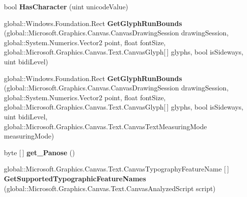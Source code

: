 \begin{DoxyCompactItemize}
bool {\bfseries Has\+Character} (uint unicode\+Value)
\item 
\mbox{\label{interface_microsoft_1_1_graphics_1_1_canvas_1_1_text_1_1_i_canvas_font_face_a32cd4710536dd3efe9632f63fb92dec4}} 
global\+::\+Windows.\+Foundation.\+Rect {\bfseries Get\+Glyph\+Run\+Bounds} (global\+::\+Microsoft.\+Graphics.\+Canvas.\+Canvas\+Drawing\+Session drawing\+Session, global\+::\+System.\+Numerics.\+Vector2 point, float font\+Size, global\+::\+Microsoft.\+Graphics.\+Canvas.\+Text.\+Canvas\+Glyph\mbox{[}$\,$\mbox{]} glyphs, bool is\+Sideways, uint bidi\+Level)
\item 
\mbox{\label{interface_microsoft_1_1_graphics_1_1_canvas_1_1_text_1_1_i_canvas_font_face_ab4bcc736bd64c389afff43dc59261d7a}} 
global\+::\+Windows.\+Foundation.\+Rect {\bfseries Get\+Glyph\+Run\+Bounds} (global\+::\+Microsoft.\+Graphics.\+Canvas.\+Canvas\+Drawing\+Session drawing\+Session, global\+::\+System.\+Numerics.\+Vector2 point, float font\+Size, global\+::\+Microsoft.\+Graphics.\+Canvas.\+Text.\+Canvas\+Glyph\mbox{[}$\,$\mbox{]} glyphs, bool is\+Sideways, uint bidi\+Level, global\+::\+Microsoft.\+Graphics.\+Canvas.\+Text.\+Canvas\+Text\+Measuring\+Mode measuring\+Mode)
\item 
\mbox{\label{interface_microsoft_1_1_graphics_1_1_canvas_1_1_text_1_1_i_canvas_font_face_ac7be86dad891579aead7f004b66c982b}} 
byte \mbox{[}$\,$\mbox{]} {\bfseries get\+\_\+\+Panose} ()
\item 
\mbox{\label{interface_microsoft_1_1_graphics_1_1_canvas_1_1_text_1_1_i_canvas_font_face_a01f36f433afb1083c97290d046937f8d}} 
global\+::\+Microsoft.\+Graphics.\+Canvas.\+Text.\+Canvas\+Typography\+Feature\+Name \mbox{[}$\,$\mbox{]} {\bfseries Get\+Supported\+Typographic\+Feature\+Names} (global\+::\+Microsoft.\+Graphics.\+Canvas.\+Text.\+Canvas\+Analyzed\+Script script)
\item 
\mbox{\label{interface_microsoft_1_1_graphics_1_1_canvas_1_1_text_1_1_i_canvas_font_face_ab214ca68fc058daaf2086d1a25bb9ed0}} 

\end{DoxyCompactItemize}
